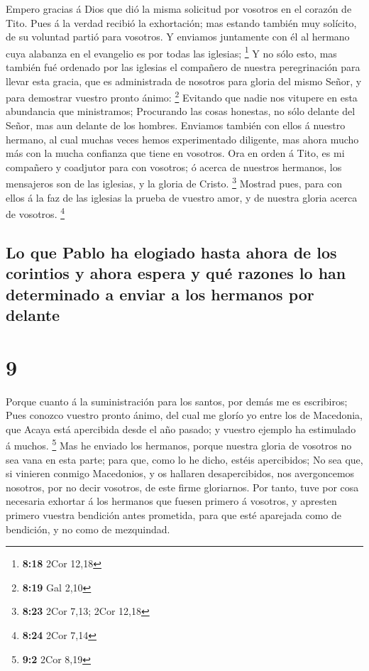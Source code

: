  Empero gracias á Dios que dió la misma solicitud por
vosotros en el corazón de Tito.  Pues á la verdad recibió
la exhortación; mas estando también muy solícito, de su voluntad partió
para vosotros.  Y enviamos juntamente con él al hermano
cuya alabanza en el evangelio es por todas las iglesias; \footnote{\textbf{8:18}
  2Cor 12,18}  Y no sólo esto, mas también fué ordenado por
las iglesias el compañero de nuestra peregrinación para llevar esta
gracia, que es administrada de nosotros para gloria del mismo Señor, y
para demostrar vuestro pronto ánimo: \footnote{\textbf{8:19} Gal 2,10}
 Evitando que nadie nos vitupere en esta abundancia que
ministramos;  Procurando las cosas honestas, no sólo
delante del Señor, mas aun delante de los hombres. 
Enviamos también con ellos á nuestro hermano, al cual muchas veces hemos
experimentado diligente, mas ahora mucho más con la mucha confianza que
tiene en vosotros.  Ora en orden á Tito, es mi compañero y
coadjutor para con vosotros; ó acerca de nuestros hermanos, los
mensajeros son de las iglesias, y la gloria de Cristo. \footnote{\textbf{8:23}
  2Cor 7,13; 2Cor 12,18}  Mostrad pues, para con ellos á la
faz de las iglesias la prueba de vuestro amor, y de nuestra gloria
acerca de vosotros. \footnote{\textbf{8:24} 2Cor 7,14}

\hypertarget{lo-que-pablo-ha-elogiado-hasta-ahora-de-los-corintios-y-ahora-espera-y-quuxe9-razones-lo-han-determinado-a-enviar-a-los-hermanos-por-delante}{%
\subsection{Lo que Pablo ha elogiado hasta ahora de los corintios y
ahora espera y qué razones lo han determinado a enviar a los hermanos
por
delante}\label{lo-que-pablo-ha-elogiado-hasta-ahora-de-los-corintios-y-ahora-espera-y-quuxe9-razones-lo-han-determinado-a-enviar-a-los-hermanos-por-delante}}

\hypertarget{section-8}{%
\section{9}\label{section-8}}

 Porque cuanto á la suministración para los santos, por
demás me es escribiros;  Pues conozco vuestro pronto ánimo,
del cual me glorío yo entre los de Macedonia, que Acaya está apercibida
desde el año pasado; y vuestro ejemplo ha estimulado á muchos.
\footnote{\textbf{9:2} 2Cor 8,19}  Mas he enviado los
hermanos, porque nuestra gloria de vosotros no sea vana en esta parte;
para que, como lo he dicho, estéis apercibidos;  No sea que,
si vinieren conmigo Macedonios, y os hallaren desapercibidos, nos
avergoncemos nosotros, por no decir vosotros, de este firme gloriarnos.
 Por tanto, tuve por cosa necesaria exhortar á los hermanos
que fuesen primero á vosotros, y apresten primero vuestra bendición
antes prometida, para que esté aparejada como de bendición, y no como de
mezquindad.

